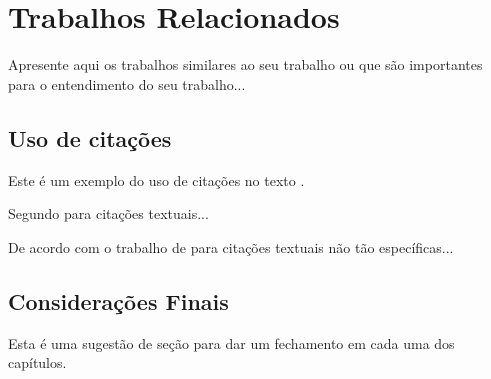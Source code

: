\chapter{Trabalhos Relacionados}
\label{cap:trabalhos:relacionados}

Apresente aqui os trabalhos similares ao seu trabalho ou que são importantes para o entendimento do seu trabalho...

\section{Uso de citações}
\label{cap:trabalhos:sec:relacionados:uso:citacoes}

Este é um exemplo do uso de citações no texto \cite{tomasulo:algorithm:5392028}.

Segundo  para citações textuais...

De acordo com o trabalho de  para citações textuais não tão específicas...

\section{Considerações Finais}
\label{cap:trabalhos:relacionados:sec:consideracoes:finais}

Esta é uma sugestão de seção para dar um fechamento em cada uma dos capítulos.